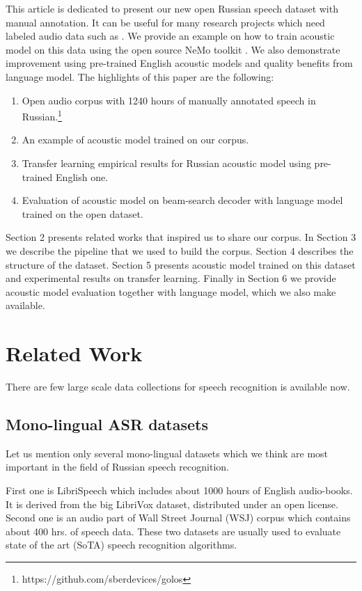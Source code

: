 \documentclass[a4paper]{article}
\begin{document}
 This article is dedicated to present our new open Russian speech dataset with manual annotation. It can be useful for many research projects which need labeled audio data such as \cite{savchenko2008analyse, gubochkin2013cl}. We provide an example on how to train acoustic model on this data using the open source NeMo toolkit \cite{kuchaiev2019nemo}. We also demonstrate improvement using pre-trained English acoustic models and quality benefits from language model. The highlights of this paper are the following:
\begin{enumerate}
\item Open audio corpus with 1240 hours of manually annotated speech in Russian.\footnote{https://github.com/sberdevices/golos}
\item An example of acoustic model trained on our corpus.
\item Transfer learning empirical results for Russian acoustic model using pre-trained English one.
\item Evaluation of acoustic model on beam-search decoder with language model trained on the open dataset.
\end{enumerate}

Section 2 presents related works that inspired us to share our corpus. In Section 3 we describe the pipeline that we used to build the corpus. Section 4 describes the structure of the dataset. Section 5 presents acoustic model trained on this dataset and experimental results on transfer learning. Finally in Section 6 we provide acoustic model evaluation together with language model, which we also make available.

\section{Related Work}

There are few large scale data collections for speech recognition is available now. 

\subsection{Mono-lingual ASR datasets}

Let us mention only several mono-lingual datasets which we think are most important in the field of Russian speech recognition.

First one is LibriSpeech \cite{panayotov2015librispeech} which includes about 1000 hours of English audio-books. It is derived from the big LibriVox dataset,  distributed under an open license. Second one is an audio part of Wall Street Journal (WSJ) corpus \cite{paul1992design} which contains about 400 hrs. of speech data. These two datasets are usually used to evaluate state of the art (SoTA) speech recognition algorithms.
\end{document}
